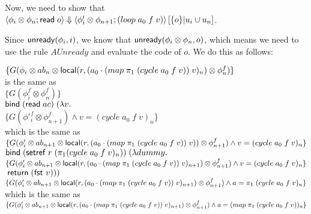 \documentclass{article}
\begin{document}
Now, we need to show that $\left<{\phi_i \otimes \phi_n};{\mbox{\textsf{{read}}}\; o}\right>\Downarrow\left<{\phi'_i \otimes \phi_{n+1}};{(loop\;a_0\;f\;v)}\right>\left[{\{{o}\}}|{u_i \cup u_n}\right]$. 

Since $\mbox{\textsf{{unready}}}({\phi_i}, {i})$, we know that $\mbox{\textsf{{unready}}}({\phi_i \otimes \phi_n}, {o})$, which
means we need to use the rule $AUnready$ and evaluate the code of $o$. We do this
as follows: 

\begin{tabbing}
$\{G(\phi_i \otimes ab_n 
     \otimes \mbox{\textsf{{local}}}({r}, {(a_0\cdot(map\;\pi_1\;(cycle\;a_0\;f\;v))\;v)_n}) 
     \otimes \phi^f_n)\}$ \\
is the same as \\
$\{G(\phi^f_i \otimes \phi^f_n)\}$ \\
$\mbox{\textsf{{bind}}}\; (\mbox{\textsf{{read}}}\; ac) \;(\lambda v.$ \\
$\{G(\phi'^f_i \otimes \phi^f_{n+1}) \land v = (cycle\;a_0\;f\;v)_n\}$ \\
which is the same as \\
$\{G(\phi'_i \otimes ab_{n+1}
     \otimes \mbox{\textsf{{local}}}({r}, {(a_0\cdot(map\;\pi_1\;(cycle\;a_0\;f\;v))\;v)}) 
     \otimes \phi^f_{n+1}) \land v = (cycle\;a_0\;f\;v)_n\}$ \\
$\mbox{\textsf{{bind}}}\; (\mbox{\textsf{{setref}}}\; r \;(\pi_1 (cycle\;a_0\;f\;v)_n)) \;(\lambda dummy.\;$ \\
$\{G(\phi'_i \otimes ab_{n+1}
     \otimes \mbox{\textsf{{local}}}({r}, {(a_0\cdot(map\;\pi_1\;(cycle\;a_0\;f\;v))\;v)_{n+1}}) 
     \otimes \phi^f_{n+1}) \land v = (cycle\;a_0\;f\;v)_n\}$ \\
$\;\mbox{\textsf{{return}}}\; (\mbox{\textsf{{fst }}} v)))$ \\
$\{G(\phi'_i \otimes ab_{n+1}
     \otimes \mbox{\textsf{{local}}}({r}, {(a_0\cdot(map\;\pi_1\;(cycle\;a_0\;f\;v))\;v)_{n+1}}) 
     \otimes \phi^f_{n+1}) \land a = \pi_1\;(cycle\;a_0\;f\;v)_n\}$ \\
which is the same as \\
$\{G(\phi'_i \otimes ab_{n+1}
     \otimes \mbox{\textsf{{local}}}({r}, {(a_0\cdot(map\;\pi_1\;(cycle\;a_0\;f\;v))\;v)_{n+1}}) 
     \otimes \phi^f_{n+1}) \land a = (map\;\pi_1\;(cycle\;a_0\;f\;v))_n\}$ \\

\end{tabbing}
\end{document}
